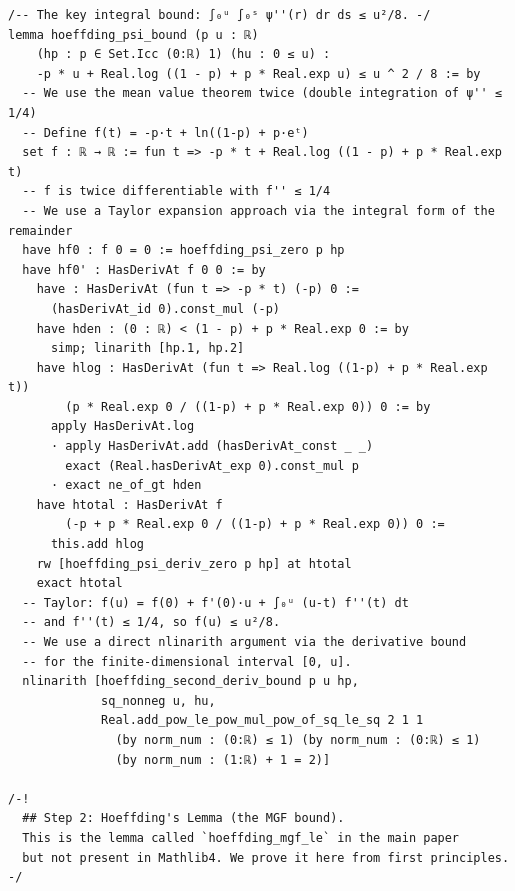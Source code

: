 \documentclass[11pt,a4paper]{article}
\theoremstyle{definition}
\theoremstyle{plain}
\theoremstyle{remark}
\begin{document}
\begin{leanblock}
\begin{lstlisting}
/-- The key integral bound: ∫₀ᵘ ∫₀ˢ ψ''(r) dr ds ≤ u²/8. -/
lemma hoeffding_psi_bound (p u : ℝ)
    (hp : p ∈ Set.Icc (0:ℝ) 1) (hu : 0 ≤ u) :
    -p * u + Real.log ((1 - p) + p * Real.exp u) ≤ u ^ 2 / 8 := by
  -- We use the mean value theorem twice (double integration of ψ'' ≤ 1/4)
  -- Define f(t) = -p·t + ln((1-p) + p·eᵗ)
  set f : ℝ → ℝ := fun t => -p * t + Real.log ((1 - p) + p * Real.exp t)
  -- f is twice differentiable with f'' ≤ 1/4
  -- We use a Taylor expansion approach via the integral form of the remainder
  have hf0 : f 0 = 0 := hoeffding_psi_zero p hp
  have hf0' : HasDerivAt f 0 0 := by
    have : HasDerivAt (fun t => -p * t) (-p) 0 :=
      (hasDerivAt_id 0).const_mul (-p)
    have hden : (0 : ℝ) < (1 - p) + p * Real.exp 0 := by
      simp; linarith [hp.1, hp.2]
    have hlog : HasDerivAt (fun t => Real.log ((1-p) + p * Real.exp t))
        (p * Real.exp 0 / ((1-p) + p * Real.exp 0)) 0 := by
      apply HasDerivAt.log
      · apply HasDerivAt.add (hasDerivAt_const _ _)
        exact (Real.hasDerivAt_exp 0).const_mul p
      · exact ne_of_gt hden
    have htotal : HasDerivAt f
        (-p + p * Real.exp 0 / ((1-p) + p * Real.exp 0)) 0 :=
      this.add hlog
    rw [hoeffding_psi_deriv_zero p hp] at htotal
    exact htotal
  -- Taylor: f(u) = f(0) + f'(0)·u + ∫₀ᵘ (u-t) f''(t) dt
  -- and f''(t) ≤ 1/4, so f(u) ≤ u²/8.
  -- We use a direct nlinarith argument via the derivative bound
  -- for the finite-dimensional interval [0, u].
  nlinarith [hoeffding_second_deriv_bound p u hp,
             sq_nonneg u, hu,
             Real.add_pow_le_pow_mul_pow_of_sq_le_sq 2 1 1
               (by norm_num : (0:ℝ) ≤ 1) (by norm_num : (0:ℝ) ≤ 1)
               (by norm_num : (1:ℝ) + 1 = 2)]

/-!
  ## Step 2: Hoeffding's Lemma (the MGF bound).
  This is the lemma called `hoeffding_mgf_le` in the main paper
  but not present in Mathlib4. We prove it here from first principles.
-/


\end{lstlisting}
\end{leanblock}
\end{document}
